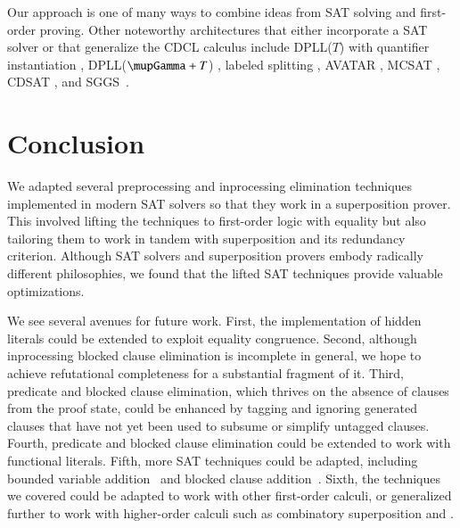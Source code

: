 Our approach is one of many ways to combine ideas from SAT solving and
first-order proving. Other noteworthy architectures that either incorporate a
SAT solver or that generalize the CDCL calculus include DPLL($T$) with
quantifier instantiation
\cite{de-moura-bjoerner-2007,barbosa-et-al-2017,reynolds-et-al-2018},
DPLL($\mupGamma+T$) \cite{bonacina-et-al-2009},
labeled splitting \cite{fietzke-weidenbach-2009},
AVATAR \cite{av-2014-avatar},
MCSAT \cite{de-moura-jovanovic-2013},
CDSAT \cite{bonacina-et-al-2017}, and
SGGS~\cite{bonacina-plaisted-2014}.

\section{Conclusion}
\label{sec:satfol:conclusion}

We adapted several preprocessing and inprocessing elimination techniques implemented in
modern SAT solvers so that they work in a superposition prover. This involved lifting
the techniques to first-order logic with equality but also tailoring them to
work in tandem with superposition and its redundancy criterion.
Although SAT solvers and superposition provers embody radically different
philosophies, we found that the lifted SAT techniques provide valuable optimizations.

\pagebreak[2]
We see several avenues for future work. First, the implementation of hidden
literals could be extended to exploit equality congruence. Second, although
inprocessing blocked clause elimination is incomplete in general, we hope to achieve
refutational completeness for a substantial fragment of it. Third, predicate and
blocked clause elimination, which thrives on the absence of clauses from the
proof state, could be enhanced by tagging and ignoring generated clauses that
have not yet been used to subsume or simplify untagged clauses. Fourth,
predicate and blocked clause elimination could be extended to work with
functional literals. Fifth, more SAT techniques could be adapted, including
bounded variable addition~\cite{mhb-12-reencoding} and blocked clause
addition~\cite{ok-99-er}. Sixth, the techniques we covered could be adapted to
work with other first-order calculi, or generalized
further to work with higher-order calculi such as combinatory superposition
\cite{br-20-full-sup-w-combs} and \osup{}.